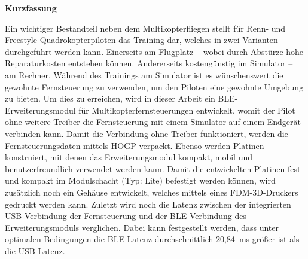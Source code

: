 
\pagestyle{empty}

\newenvironment{abstractpage}
  {\cleardoublepage\vspace*{\fill}\thispagestyle{empty}}
  {\vfill\cleardoublepage}
\newenvironment{abstractsection}[1]
  {\bigskip
   \begin{center}\bfseries#1\end{center}}
  {\par\bigskip}

\begin{abstractpage}
    \begin{abstractsection}{Kurzfassung}
      Ein wichtiger Bestandteil neben dem Multikopterfliegen stellt für Renn- und Freestyle-Quadro\-kopterpiloten das Training dar, welches in zwei Varianten durchgeführt werden kann. Einerseits am Flugplatz -- wobei durch Abstürze hohe Reparaturkosten entstehen können. Andererseits kostengünstig im Simulator -- am Rechner. Während des Trainings am Simulator ist es wünschenswert die gewohnte Fernsteuerung zu verwenden, um den Piloten eine gewohnte Umgebung zu bieten. Um dies zu erreichen, wird in dieser Arbeit ein \acs{BLE}-Erweiterungsmodul für Multikopterfernsteuerungen entwickelt, womit der Pilot ohne weitere Treiber die Fernsteuerung mit einem Simulator auf einem Endgerät verbinden kann. Damit die Verbindung ohne Treiber funktioniert, werden die Fernsteuerungsdaten mittels \acs{HOGP} verpackt. Ebenso werden Platinen konstruiert, mit denen das Erweiterungsmodul kompakt, mobil und benutzerfreundlich verwendet werden kann. Damit die entwickelten Platinen fest und kompakt im Modulschacht (Typ: Lite) befestigt werden können, wird zusätzlich noch ein Gehäuse entwickelt, welches mittels eines \acs{FDM}-3D-Druckers gedruckt werden kann. Zuletzt wird noch die Latenz zwischen der integrierten \acs{USB}-Verbindung der Fernsteuerung und der \acs{BLE}-Verbindung des Erweiterungsmoduls verglichen. Dabei kann festgestellt werden, dass unter optimalen Bedingungen die \acs{BLE}-Latenz durchschnittlich 20,84~ms größer ist als die \acs{USB}-Latenz. 
    \end{abstractsection}


\end{abstractpage}
